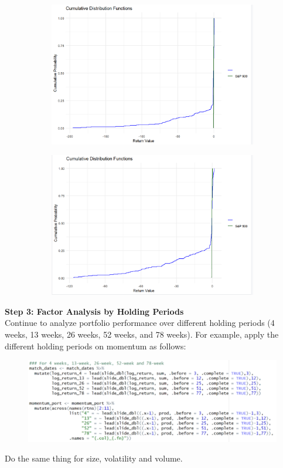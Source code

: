 \documentclass{article}
\begin{document}
\begin{figure}[H]
    \begin{subfigure}{0.45\textwidth}
        \centering
        \includegraphics[width=\textwidth]{31.png}
        \label{fig:image31}
    \end{subfigure}
    \hspace{0.05\textwidth}
    \begin{subfigure}{0.45\textwidth}
        \centering
        \includegraphics[width=\textwidth]{32.png}
        \label{fig:image32}
    \end{subfigure}
    \label{fig:additional_images}
\end{figure}
\textbf{Step 3: Factor Analysis by Holding Periods}\\
Continue to analyze portfolio performance over different holding periods (4 weeks, 13 weeks, 26 weeks, 52 weeks, and 78 weeks).
For example, apply the different holding periods on momentum as follows:
\begin{figure}[H]
    \centering
    \includegraphics[width=0.5\linewidth]{20.png}
    \label{fig:enter-label}
\end{figure}
Do the same thing for size, volatility and volume.
\end{document}
